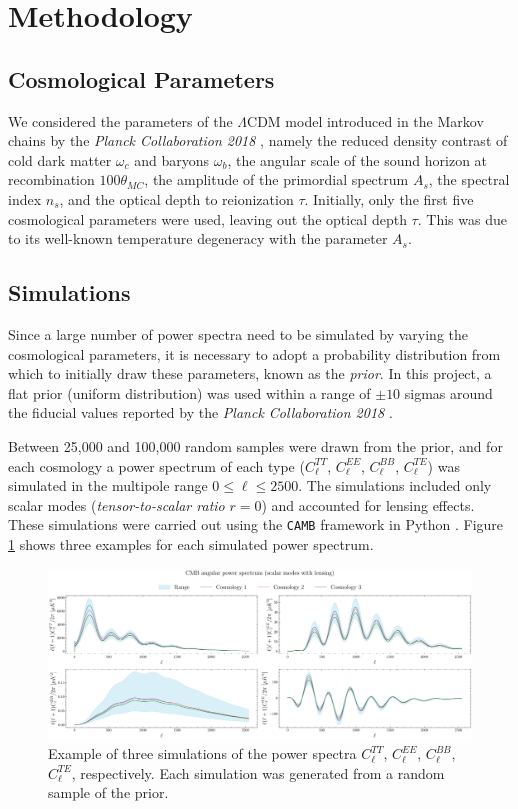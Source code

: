 \section{Methodology}
\subsection{Cosmological Parameters}
We considered the parameters of the $\Lambda$CDM model introduced in the Markov chains by the \textit{Planck Collaboration 2018} \cite{planck2018}, namely the reduced density contrast of cold dark matter $\omega_c$ and baryons $\omega_b$, the angular scale of the sound horizon at recombination $100\theta_{MC}$, the amplitude of the primordial spectrum $A_s$, the spectral index $n_s$, and the optical depth to reionization $\tau$. Initially, only the first five cosmological parameters were used, leaving out the optical depth $\tau$. This was due to its well-known temperature degeneracy with the parameter $A_s$.  

\subsection{Simulations}
Since a large number of power spectra need to be simulated by varying the cosmological parameters, it is necessary to adopt a probability distribution from which to initially draw these parameters, known as the \textit{prior}. In this project, a flat prior (uniform distribution) was used within a range of $\pm 10$ sigmas around the fiducial values reported by the \textit{Planck Collaboration 2018} \cite{planck2018}.  

Between 25,000 and 100,000 random samples were drawn from the prior, and for each cosmology a power spectrum of each type ($C_{\ell}^{TT}$, $C_{\ell}^{EE}$, $C_{\ell}^{BB}$, $C_{\ell}^{TE}$) was simulated in the multipole range $0 \leq \ell \leq 2500$. The simulations included only scalar modes (\textit{tensor-to-scalar ratio} \(r = 0\)) and accounted for lensing effects. These simulations were carried out using the \texttt{CAMB} framework in Python \cite{CAMB}. Figure \ref{fig:example_sim} shows three examples for each simulated power spectrum.  

\begin{figure}
    \centering
    \includegraphics[scale=0.225]{img/cmb_aps_subplot_0.pdf}
    \caption{Example of three simulations of the power spectra $C_{\ell}^{TT}$, $C_{\ell}^{EE}$, $C_{\ell}^{BB}$, $C_{\ell}^{TE}$, respectively. Each simulation was generated from a random sample of the prior.}
    \label{fig:example_sim}
\end{figure}

